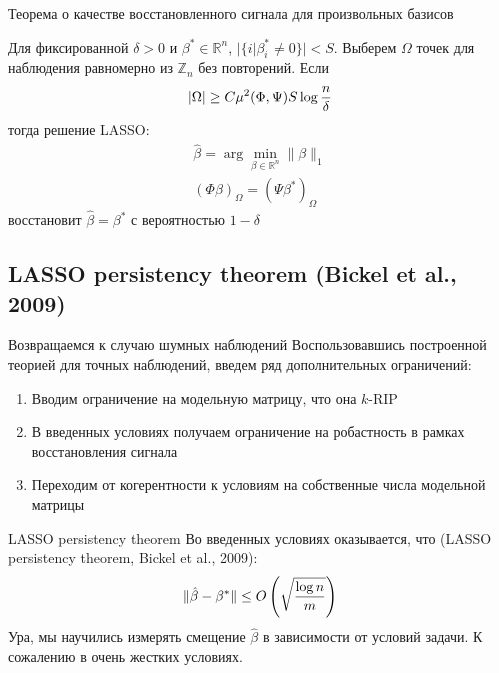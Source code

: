 \documentclass[14pt, fleqn, xcolor={dvipsnames, table}]{beamer}
\begin{document}
\begin{frame}{Теорема о качестве восстановленного сигнала для произвольных базисов}
\small
\begin{theorem}
Для фиксированной $\delta > 0$ и $\beta^* \in \mathbb{R}^n$, $|\{i | \beta^*_i \ne 0\}| < S$. Выберем $\Omega$ точек для наблюдения равномерно из $\mathbb{Z}_n$ без повторений. Если
$$|\Omega| \ge C \mu^2(\Phi,\Psi)S\log {n\over\delta}$$
тогда решение LASSO:
$$\begin{array}{l}
\hat{\beta} = \arg \min_{\beta \in \mathbb{R}^n} \|\beta\|_1 \\
(\Phi \beta)_\Omega = (\Psi \beta^*)_\Omega
\end{array}$$
восстановит $\hat{\beta} = \beta^*$ с вероятностью $1 - \delta$
\end{theorem}
\end{frame}

\subsection{LASSO persistency theorem (Bickel et al., 2009)}
\begin{frame}{Возвращаемся к случаю шумных наблюдений}
\small
Воспользовавшись построенной теорией для точных наблюдений, введем ряд дополнительных ограничений:
\begin{enumerate}
  \item Вводим ограничение на модельную матрицу, что она $k$-RIP 
  \item В введенных условиях получаем ограничение на робастность в рамках восстановления сигнала
  \item Переходим от когерентности к условиям на собственные числа модельной матрицы
\end{enumerate}
\end{frame}
\begin{frame}{LASSO persistency theorem}
Во введенных условиях оказывается, что (LASSO persistency theorem, Bickel et al., 2009):
$$
\|\hat{\beta} - \beta^*\| \le O\left(\sqrt{\log n \over m}\right)
$$
Ура, мы научились измерять смещение $\hat{\beta}$ в зависимости от условий задачи. К сожалению в очень жестких условиях.
\end{frame}
\end{document}
